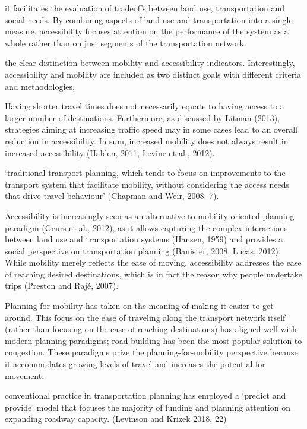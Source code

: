 \documentclass[12pt,]{article}
\begin{document}
it facilitates the evaluation of tradeoffs between land use,
transportation and social needs. By combining aspects of land use and
transportation into a single measure, accessibility focuses attention on
the performance of the system as a whole rather than on just segments of
the transportation network.

the clear distinction between mobility and accessibility indicators.
Interestingly, accessibility and mobility are included as two distinct
goals with different criteria and methodologies,

Having shorter travel times does not necessarily equate to having access
to a larger number of destinations. Furthermore, as discussed by Litman
(2013), strategies aiming at increasing traffic speed may in some cases
lead to an overall reduction in accessibility. In sum, increased
mobility does not always result in increased accessibility (Halden,
2011, Levine et al., 2012).

`traditional transport planning, which tends to focus on improvements to
the transport system that facilitate mobility, without considering the
access needs that drive travel behaviour' (Chapman and Weir, 2008: 7).

Accessibility is increasingly seen as an alternative to mobility
oriented planning paradigm (Geurs et al., 2012), as it allows capturing
the complex interactions between land use and transportation systems
(Hansen, 1959) and provides a social perspective on transportation
planning (Banister, 2008, Lucas, 2012). While mobility merely reflects
the ease of moving, accessibility addresses the ease of reaching desired
destinations, which is in fact the reason why people undertake trips
(Preston and Rajé, 2007).

Planning for mobility has taken on the meaning of making it easier to
get around. This focus on the ease of traveling along the transport
network itself (rather than focusing on the ease of reaching
destinations) has aligned well with modern planning paradigms; road
building has been the most popular solution to congestion. These
paradigms prize the planning-for-mobility perspective because it
accommodates growing levels of travel and increases the potential for
movement.

conventional practice in transportation planning has employed a `predict
and provide' model that focuses the majority of funding and planning
attention on expanding roadway capacity. (Levinson and Krizek 2018, 22)
\end{document}
